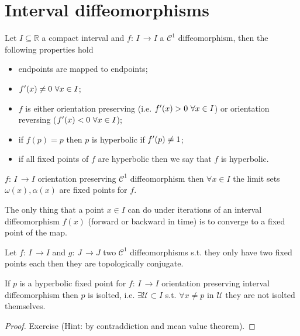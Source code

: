 \documentclass[../main.tex]{subfiles}
\begin{document}
\section{Interval diffeomorphisms}\label{sec2}
\begin{definition}\label{def1}
     Let $I \subseteq \mathbb{R}$ a compact interval and $f:\,I\,\to I$ a $\mathcal{C}^{1}$ diffeomorphism, then the following properties hold
     \begin{itemize}
          \item endpoints are mapped to endpoints;
          \item $f'(x)\neq 0\,\,\forall x\in I$;
          \item $f$ is either orientation preserving (i.e. $f'(x)>0\,\,\forall x\in I$) or orientation reversing ($f'(x)<0\,\,\forall x \in I$);
          \item if $f(p)=p$ then $p$ is hyperbolic if $f'(p)\neq1$;
          \item if all fixed points of $f$ are hyperbolic then we say that $f$ is hyperbolic.
     \end{itemize}
\end{definition}
\begin{proposition*}
     $f:\,I\,\to I$ orientation preserving $\mathcal{C}^{1}$ diffeomorphism then $\forall x \in I$ the limit sets $\omega(x), \alpha(x)$ are fixed points for $f$.
\end{proposition*}
\begin{interpretation*}{}
     The only thing that a point $x\in I$ can do under iterations of an interval diffeomorphism $f(x)$ (forward or backward in time) is to converge to a fixed point of the map.
\end{interpretation*}
\begin{observation}[]\label{obs1}
     Let $f:\,I\,\to I$ and $g:\,J\,\to J$ two $\mathcal{C}^{1}$ diffeomorphisms s.t. they only have two fixed points each then they are topologically conjugate.
\end{observation}
\begin{lemma}
     If $p$ is a hyperbolic fixed point for $f:\,I\,\to I$ orientation preserving interval diffeomorphism then $p$ is isolted, i.e. $\exists \mathcal{U} \subset I$ s.t. $\forall x\neq p$ in $\mathcal{U}$ they are not isolted themselves.
\end{lemma}
\begin{proof}
     Exercise (Hint: by contraddiction and mean value theorem).
\end{proof}
\end{document}
